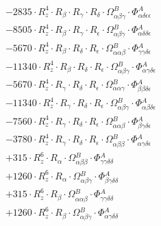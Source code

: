 \documentclass{article}
\begin{document}
\begin{subequations}
\begin{gather}
\begin{array}{c}
 \\[0.2em] 		 - 2835 \cdot R_{z}^{4} \cdot R_{\beta{}} \cdot R_{\gamma{}} \cdot R_{\delta{}} \cdot \Omega{}^{B}_{\alpha{}\beta{}\gamma{}} \cdot \Phi{}^{A}_{\alpha{}\delta{}\epsilon{}\epsilon{}} 
 \\[0.2em] 		 - 8505 \cdot R_{z}^{4} \cdot R_{\beta{}} \cdot R_{\gamma{}} \cdot R_{\epsilon{}} \cdot \Omega{}^{B}_{\alpha{}\beta{}\gamma{}} \cdot \Phi{}^{A}_{\alpha{}\delta{}\delta{}\epsilon{}} 
 \\[0.2em] 		 - 5670 \cdot R_{z}^{4} \cdot R_{\beta{}} \cdot R_{\delta{}} \cdot R_{\epsilon{}} \cdot \Omega{}^{B}_{\alpha{}\alpha{}\beta{}} \cdot \Phi{}^{A}_{\gamma{}\gamma{}\delta{}\epsilon{}} 
 \\[0.2em] 		 - 11340 \cdot R_{z}^{4} \cdot R_{\beta{}} \cdot R_{\delta{}} \cdot R_{\epsilon{}} \cdot \Omega{}^{B}_{\alpha{}\beta{}\gamma{}} \cdot \Phi{}^{A}_{\alpha{}\gamma{}\delta{}\epsilon{}} 
 \\[0.2em] 		 - 5670 \cdot R_{z}^{4} \cdot R_{\gamma{}} \cdot R_{\delta{}} \cdot R_{\epsilon{}} \cdot \Omega{}^{B}_{\alpha{}\alpha{}\gamma{}} \cdot \Phi{}^{A}_{\beta{}\beta{}\delta{}\epsilon{}} 
 \\[0.2em] 		 - 11340 \cdot R_{z}^{4} \cdot R_{\gamma{}} \cdot R_{\delta{}} \cdot R_{\epsilon{}} \cdot \Omega{}^{B}_{\alpha{}\beta{}\gamma{}} \cdot \Phi{}^{A}_{\alpha{}\beta{}\delta{}\epsilon{}} 
 \\[0.2em] 		 - 7560 \cdot R_{z}^{4} \cdot R_{\gamma{}} \cdot R_{\delta{}} \cdot R_{\epsilon{}} \cdot \Omega{}^{B}_{\alpha{}\alpha{}\beta{}} \cdot \Phi{}^{A}_{\beta{}\gamma{}\delta{}\epsilon{}} 
 \\[0.2em] 		 - 3780 \cdot R_{z}^{4} \cdot R_{\gamma{}} \cdot R_{\delta{}} \cdot R_{\epsilon{}} \cdot \Omega{}^{B}_{\alpha{}\beta{}\beta{}} \cdot \Phi{}^{A}_{\alpha{}\gamma{}\delta{}\epsilon{}} 
 \\[0.2em] 		 + 315 \cdot R_{z}^{6} \cdot R_{\alpha{}} \cdot \Omega{}^{B}_{\alpha{}\beta{}\beta{}} \cdot \Phi{}^{A}_{\gamma{}\gamma{}\delta{}\delta{}} 
 \\[0.2em] 		 + 1260 \cdot R_{z}^{6} \cdot R_{\alpha{}} \cdot \Omega{}^{B}_{\alpha{}\beta{}\gamma{}} \cdot \Phi{}^{A}_{\beta{}\gamma{}\delta{}\delta{}} 
 \\[0.2em] 		 + 315 \cdot R_{z}^{6} \cdot R_{\beta{}} \cdot \Omega{}^{B}_{\alpha{}\alpha{}\beta{}} \cdot \Phi{}^{A}_{\gamma{}\gamma{}\delta{}\delta{}} 
 \\[0.2em] 		 + 1260 \cdot R_{z}^{6} \cdot R_{\beta{}} \cdot \Omega{}^{B}_{\alpha{}\beta{}\gamma{}} \cdot \Phi{}^{A}_{\alpha{}\gamma{}\delta{}\delta{}} 

\end{array}
\end{gather}
\end{subequations}
\end{document}
